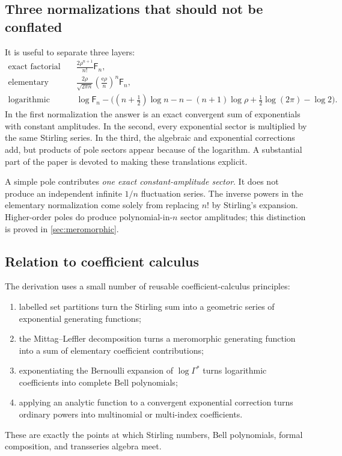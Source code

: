 \documentclass[11pt,a4paper,oneside]{article}
\theoremstyle{definition}
\theoremstyle{remark}
\newcommand{\Fub}{\mathsf{F}}
\newcommand{\e}{\mathrm{e}}
\newcommand{\GammaStar}{\Gamma^{\!*}}
\begin{document}
\subsection{Three normalizations that should not be conflated}
It is useful to separate three layers:
\begin{align*}
 \text{exact factorial normalization:}\quad
 &\frac{2\rho^{n+1}}{n!}\Fub_n,\\
 \text{elementary normalization:}\quad
 &\frac{2\rho}{\sqrt{2\pi n}}
   \left(\frac{\e\rho}{n}\right)^n\Fub_n,\\
 \text{logarithmic normalization:}\quad
 &\log\Fub_n-\bigl((n+\tfrac12)\log n-n-(n+1)\log\rho
      +\tfrac12\log(2\pi)-\log2\bigr).
\end{align*}
In the first normalization the answer is an exact convergent sum of
exponentials with constant amplitudes.  In the second, every exponential
sector is multiplied by the same Stirling series.  In the third, the
algebraic and exponential corrections add, but products of pole sectors
appear because of the logarithm.  A substantial part of the paper is devoted
to making these translations explicit.

\begin{warningbox}
A simple pole contributes \emph{one exact constant-amplitude sector}.  It does
not produce an independent infinite $1/n$ fluctuation series.  The inverse
powers in the elementary normalization come solely from replacing $n!$ by
Stirling's expansion.  Higher-order poles do produce polynomial-in-$n$
sector amplitudes; this distinction is proved in \cref{sec:meromorphic}.
\end{warningbox}

\subsection{Relation to coefficient calculus}
The derivation uses a small number of reusable coefficient-calculus
principles:
\begin{enumerate}
 \item labelled set partitions turn the Stirling sum into a geometric series
       of exponential generating functions;
 \item the Mittag--Leffler decomposition turns a meromorphic generating
       function into a sum of elementary coefficient contributions;
 \item exponentiating the Bernoulli expansion of $\log\GammaStar$ turns
       logarithmic coefficients into complete Bell polynomials;
 \item applying an analytic function to a convergent exponential correction
       turns ordinary powers into multinomial or multi-index coefficients.
\end{enumerate}
These are exactly the points at which Stirling numbers, Bell polynomials,
formal composition, and transseries algebra meet.
\end{document}

